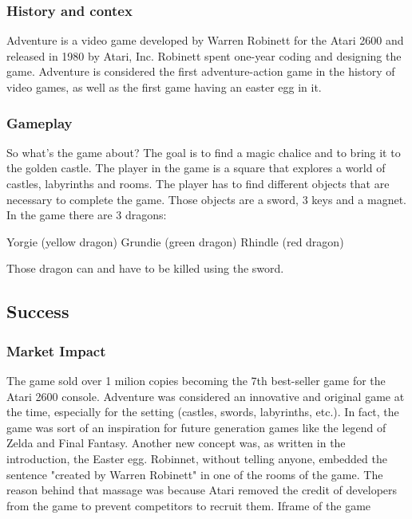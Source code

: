 \documentclass[a4paper,10pt]{book}
\begin{document}
 \subsubsection{History and contex }
   \textbf{}   \textit{}
 
                Adventure is a video game developed by Warren Robinett for the Atari 2600 and released in 1980 by Atari, Inc. Robinett spent one-year coding and designing the game. Adventure is considered the first adventure-action game in the history of video games,
                as well as the first game having an easter egg in it.

             
 \subsubsection{Gameplay }
   \textbf{}   \textit{}
 
                So what's the game about?   The goal is to find a magic chalice and to bring it to the golden castle. The player in the game is a square that explores a world of castles, labyrinths and rooms. The player has to find different objects
                that are necessary to complete the game. Those objects are a sword, 3 keys and a magnet. In the game there are 3 dragons:
                 
 Yorgie (yellow dragon) 
 Grundie (green dragon) 
 Rhindle (red dragon) 
 
                Those dragon can and have to be killed using the sword.
             
 
 \subsection{Success }
 \subsubsection{Market Impact }
            The game sold over 1 milion copies becoming the 7th best-seller game for the Atari 2600 console. Adventure was considered an innovative and original game at the time, especially for the setting (castles, swords, labyrinths, etc.). In fact, the game was
            sort of an inspiration for future generation games like the legend of Zelda and Final Fantasy. Another new concept was, as written in the introduction, the Easter egg. Robinnet, without telling anyone, embedded the sentence "created by Warren
            Robinett" in one of the rooms of the game. The reason behind that massage was because Atari removed the credit of developers from the game to prevent competitors to recruit them.
               \textbf{}   \textit{}
  Iframe of the game  
 
\end{document}
